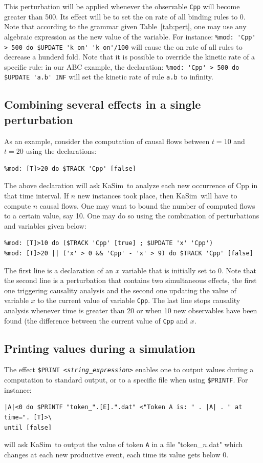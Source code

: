 \documentclass[11pt]{book}
\def\KaSim{\textsf{KaSim}}
\def\ttt#1{\texttt{#1}}
\def\var#1{{\textquotesingle}#1{\textquotesingle}}
\def\noi{\noindent}
\begin{document}
This perturbation will be applied whenever the observable \ttt{\var{Cpp}} will become greater than 500. Its effect will be to set the on rate of all binding rules to 0. Note that according to the grammar given Table~\ref{tab:pert}, one may use any algebraic expression as the new value of the variable. For instance:
\lstinline[language=kappa]!%mod: 'Cpp' > 500 do $UPDATE 'k_on' 'k_on'/100!
\noi will cause the on rate of all rules to decrease a hunderd fold. Note that it is possible to override the kinetic rate of a specific rule:  in our ABC example, the declaration:
\lstinline[language=kappa]!%mod: 'Cpp' > 500 do $UPDATE 'a.b' INF!
\noi will set the kinetic rate of rule \ttt{\var{a.b}}~to infinity. 

\subsection{Combining several effects in a single perturbation}
As an example, consider the computation of causal flows between $t=10$ and $t=20$ using the declarations:
\begin{lstlisting}[language=kappa]
%mod: [T]>10 do $TRACK 'Cpp' [true]
%mod: [T]>20 do $TRACK 'Cpp' [false]
\end{lstlisting}

The above declaration will ask \KaSim~to analyze each new occurrence of \var{Cpp} in that time interval. If $n$ new instances took place, then \KaSim~will have to compute $n$ causal flows. One may want to bound the number of computed flows to a certain value, say 10. One may do so using the combination of perturbations and variables given below:
\begin{lstlisting}[language=kappa]
%var: 'x' 0
%mod: [T]>10 do ($TRACK 'Cpp' [true] ; $UPDATE 'x' 'Cpp')
%mod: [T]>20 || ('x' > 0 && 'Cpp' - 'x' > 9) do $TRACK 'Cpp' [false]
\end{lstlisting}
The first line is a declaration of an $x$ variable that is initially set to 0. Note that the second line is a perturbation that contains two simultaneous effects, the first one triggering causality analysis and the second one updating the value of variable $x$ to the current value of variable \ttt{\var{Cpp}}.
The last line stops causality analysis whenever time is greater than 20 or when 10 new observables have been found (the difference between the current value of \ttt{\var{Cpp}} and $x$.

\subsection{Printing values during a simulation}
The effect \ttt{\$PRINT <\textit{string\_expression}>} enables one to output values during a computation to standard output, or to a specific file when using \ttt{\$PRINTF}. For instance:
\begin{lstlisting}[language=kappa]
%mod: repeat \
|A|<0 do $PRINTF "token_".[E].".dat" <"Token A is: " . |A| . " at time=". [T]>\ 
until [false]
\end{lstlisting}
will ask \KaSim~to output the value of token \ttt{A} in a file "token\_$n$.dat" which changes at each new productive event, each time its value gets below 0.
\end{document}
